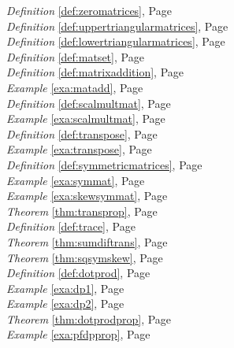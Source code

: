 \begin{multicols}{3}
\begin{center}
      \textit{Definition} \ref{def:zeromatrices}, Page \pageref{def:zeromatrices} \\
      \textit{Definition} \ref{def:uppertriangularmatrices}, Page \pageref{def:uppertriangularmatrices} \\
      \textit{Definition} \ref{def:lowertriangularmatrices}, Page \pageref{def:lowertriangularmatrices} \\
      \textit{Definition} \ref{def:matset}, Page \pageref{def:matset} \\
      \textit{Definition} \ref{def:matrixaddition}, Page \pageref{def:matrixaddition} \\
      \textit{Example} \ref{exa:matadd}, Page \pageref{exa:matadd} \\
      \textit{Definition} \ref{def:scalmultmat}, Page \pageref{def:scalmultmat} \\
      \textit{Example} \ref{exa:scalmultmat}, Page \pageref{exa:scalmultmat} \\
      \textit{Definition} \ref{def:transpose}, Page \pageref{def:transpose} \\
      \textit{Example} \ref{exa:transpose}, Page \pageref{exa:transpose} \\
      \textit{Definition} \ref{def:symmetricmatrices}, Page \pageref{def:symmetricmatrices} \\
      \textit{Example} \ref{exa:symmat}, Page \pageref{exa:symmat} \\
      \textit{Example} \ref{exa:skewsymmat}, Page \pageref{exa:skewsymmat} \\
      \textit{Theorem} \ref{thm:transprop}, Page \pageref{thm:transprop} \\
      \textit{Definition} \ref{def:trace}, Page \pageref{def:trace} \\
      \textit{Theorem} \ref{thm:sumdiftrans}, Page \pageref{thm:sumdiftrans} \\
      \textit{Theorem} \ref{thm:sqsymskew}, Page \pageref{thm:sqsymskew} \\
      \textit{Definition} \ref{def:dotprod}, Page \pageref{def:dotprod} \\
      \textit{Example} \ref{exa:dp1}, Page \pageref{exa:dp1} \\
      \textit{Example} \ref{exa:dp2}, Page \pageref{exa:dp2} \\
      \textit{Theorem} \ref{thm:dotprodprop}, Page \pageref{thm:dotprodprop} \\
      \textit{Example} \ref{exa:pfdpprop}, Page \pageref{exa:pfdpprop} \\

\end{center}
\end{multicols}
